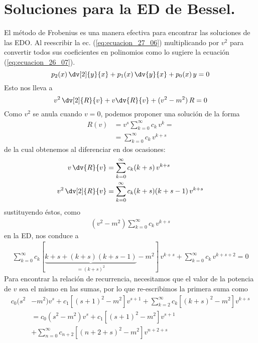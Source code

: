 \section{Soluciones para la ED de Bessel.}
El método de Frobenius es una manera efectiva para encontrar las soluciones de las EDO. Al reescribir la ec. (\ref{eq:ecuacion_27_06}) multiplicando por $v^{2}$ para convertir todos sus coeficientes en polinomios como lo sugiere la ecuación (\ref{eq:ecuacion_26_07}).
\begin{equation}
p_{2}(x) \, \dv[2]{y}{x} + p_{1}(x) \, \dv{y}{x} + p_{0} (x) \, y
 = 0
\label{eq:ecuacion_26_07}
\end{equation}
Esto nos lleva a
\begin{equation}
v^{2} \, \dv[2]{R}{v} + v \dv{R}{v} + (v^{2} - m^{2}) \, R = 0
\label{eq:ecuacion_27_07}
\end{equation}
Como $v^{2}$ se anula cuando $v = 0$, podemos proponer una solución de la forma
\begin{align*}
R(v) &= v^{s} \sum_{k=0}^{\infty} c_{k} \, v^{k} = \\
&= \sum_{k=0}^{\infty} c_{k} \, v^{k+s}
\end{align*}
de la cual obtenemos al diferenciar en dos ocasiones:
\begin{align*}
v \, \dv{R}{v} &= \sum_{k=0}^{\infty} c_{k} (k + s) \, v^{k+s} \\
v^{2} \, \dv[2]{R}{v} &= \sum_{k=0}^{\infty} c_{k} (k + s)(k + s - 1) \, v^{k+s} 
\end{align*}
sustituyendo éstos, como
\begin{align*}
(v^{2} - m^{2}) \sum_{k=0}^{\infty} c_{k} \, v^{k+s}
\end{align*}
en la ED, nos conduce a
\begin{align*}
\sum_{k=0}^{\infty} c_{k} [\underbrace{k + s + (k + s)(k + s - 1)}_{=(k+s)^{2}} - m^{2} ] \, v^{k+s} + \sum_{k=0}^{\infty} c_{k} \, v^{k+s+2} = 0
\end{align*}
Para encontrar la relación de recurrencia, necesitamos que el valor de la potencia de $v$ sea el mismo en las sumas, por lo que re-escribimos la primera suma como
\begin{align*}
c_{0}(s^{2} &- m^{2}) v^{s} + c_{1} [(s + 1)^{2}- m^{2}] v^{s+1} + \sum_{k=2}^{\infty} c_{k} [(k + s)^{2} - m^{2}] v^{k+s} \\
&= c_{0}(s^{2} - m^{2}) v^{s} + c_{1} [(s + 1)^{2}- m^{2}] v^{s+1} \\
&+ \sum_{n=0}^{\infty} c_{n+2} [(n + 2 + s)^{2} - m^{2}] v^{n+2+s}
\end{align*}
